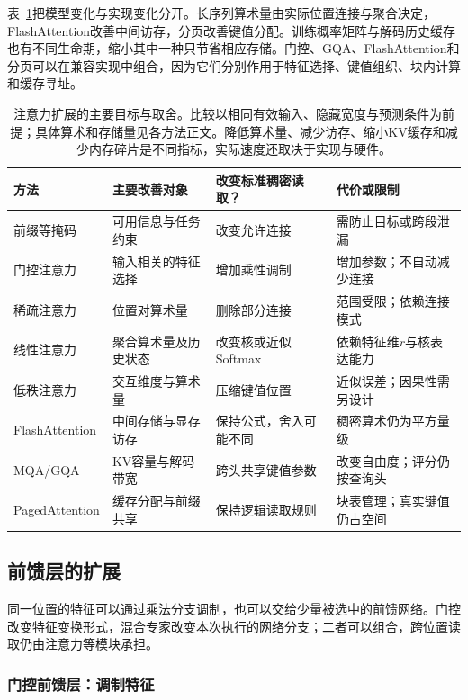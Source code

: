 表~\ref{tab:transformer-attention-extensions}把模型变化与实现变化分开。长序列算术量由实际位置连接与聚合决定，FlashAttention改善中间访存，分页改善键值分配。训练概率矩阵与解码历史缓存也有不同生命期，缩小其中一种只节省相应存储。门控、GQA、FlashAttention和分页可以在兼容实现中组合，因为它们分别作用于特征选择、键值组织、块内计算和缓存寻址。

\begin{table}[htbp]
  \centering
  \small
  \begin{tabular}{@{}p{30mm}p{37mm}p{39mm}p{49mm}@{}}
    \toprule
    方法 & 主要改善对象 & 改变标准稠密读取？ & 代价或限制 \\
    \midrule
    前缀等掩码 & 可用信息与任务约束 & 改变允许连接 & 需防止目标或跨段泄漏 \\
    门控注意力 & 输入相关的特征选择 & 增加乘性调制 & 增加参数；不自动减少连接 \\
    稀疏注意力 & 位置对算术量 & 删除部分连接 & 范围受限；依赖连接模式 \\
    线性注意力 & 聚合算术量及历史状态 & 改变核或近似Softmax & 依赖特征维$r$与核表达能力 \\
    低秩注意力 & 交互维度与算术量 & 压缩键值位置 & 近似误差；因果性需另设计 \\
    FlashAttention & 中间存储与显存访存 & 保持公式，舍入可能不同 & 稠密算术仍为平方量级 \\
    MQA/GQA & KV容量与解码带宽 & 跨头共享键值参数 & 改变自由度；评分仍按查询头 \\
    PagedAttention & 缓存分配与前缀共享 & 保持逻辑读取规则 & 块表管理；真实键值仍占空间 \\
    \bottomrule
  \end{tabular}
  \caption{注意力扩展的主要目标与取舍。比较以相同有效输入、隐藏宽度与预测条件为前提；具体算术和存储量见各方法正文。降低算术量、减少访存、缩小KV缓存和减少内存碎片是不同指标，实际速度还取决于实现与硬件。}
  \label{tab:transformer-attention-extensions}
\end{table}
\FloatBarrier

\subsection{前馈层的扩展}
\label{sec:transformer-ffn-extensions}

同一位置的特征可以通过乘法分支调制，也可以交给少量被选中的前馈网络。门控改变特征变换形式，混合专家改变本次执行的网络分支；二者可以组合，跨位置读取仍由注意力等模块承担。

\subsubsection{门控前馈层：调制特征}

